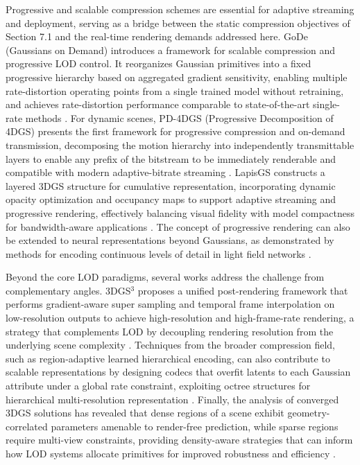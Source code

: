 \documentclass[11pt]{article}
\begin{document}
Progressive and scalable compression schemes are essential for adaptive streaming and deployment, serving as a bridge between the static compression objectives of Section 7.1 and the real-time rendering demands addressed here. GoDe (Gaussians on Demand) introduces a framework for scalable compression and progressive LOD control. It reorganizes Gaussian primitives into a fixed progressive hierarchy based on aggregated gradient sensitivity, enabling multiple rate-distortion operating points from a single trained model without retraining, and achieves rate-distortion performance comparable to state-of-the-art single-rate methods \cite{ref459}. For dynamic scenes, PD-4DGS (Progressive Decomposition of 4DGS) presents the first framework for progressive compression and on-demand transmission, decomposing the motion hierarchy into independently transmittable layers to enable any prefix of the bitstream to be immediately renderable and compatible with modern adaptive-bitrate streaming \cite{ref414}. LapisGS constructs a layered 3DGS structure for cumulative representation, incorporating dynamic opacity optimization and occupancy maps to support adaptive streaming and progressive rendering, effectively balancing visual fidelity with model compactness for bandwidth-aware applications \cite{ref460}. The concept of progressive rendering can also be extended to neural representations beyond Gaussians, as demonstrated by methods for encoding continuous levels of detail in light field networks \cite{ref461}.

Beyond the core LOD paradigms, several works address the challenge from complementary angles. 3DGS\(^3\) proposes a unified post-rendering framework that performs gradient-aware super sampling and temporal frame interpolation on low-resolution outputs to achieve high-resolution and high-frame-rate rendering, a strategy that complements LOD by decoupling rendering resolution from the underlying scene complexity \cite{ref462}. Techniques from the broader compression field, such as region-adaptive learned hierarchical encoding, can also contribute to scalable representations by designing codecs that overfit latents to each Gaussian attribute under a global rate constraint, exploiting octree structures for hierarchical multi-resolution representation \cite{ref463}. Finally, the analysis of converged 3DGS solutions has revealed that dense regions of a scene exhibit geometry-correlated parameters amenable to render-free prediction, while sparse regions require multi-view constraints, providing density-aware strategies that can inform how LOD systems allocate primitives for improved robustness and efficiency \cite{ref464}.
\end{document}
